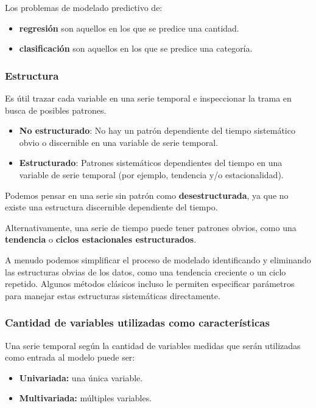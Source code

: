 \documentclass[a4paper,12pt]{article}
\begin{document}
Los problemas de modelado predictivo de:

\begin{itemize}
	\item \textbf{regresión} son aquellos en los que se predice una cantidad.
	\item  \textbf{clasificación} son aquellos en los que se predice una categoría.
\end{itemize}

\subsubsection{Estructura}

Es útil trazar cada variable en una serie temporal e inspeccionar la trama en busca de posibles patrones.

\begin{itemize}
	\item \textbf{No estructurado}: No hay un patrón dependiente del tiempo sistemático obvio o discernible en una variable de serie temporal.

	\item \textbf{Estructurado}: Patrones sistemáticos dependientes del tiempo en una variable de serie temporal (por ejemplo, tendencia y/o estacionalidad).
\end{itemize}

Podemos pensar en una serie sin patrón como \textbf{desestructurada}, ya que no existe una estructura discernible dependiente del tiempo.

Alternativamente, una serie de tiempo puede tener patrones obvios, como una \textbf{tendencia} o \textbf{ciclos estacionales estructurados}.

A menudo podemos simplificar el proceso de modelado identificando y eliminando las estructuras obvias de los datos, como una tendencia creciente o un ciclo repetido. Algunos métodos clásicos incluso le permiten especificar parámetros para manejar estas estructuras sistemáticas directamente.

\subsubsection{Cantidad de variables utilizadas como características}

Una serie temporal según la cantidad de variables medidas que serán utilizadas como entrada al modelo puede ser:
\begin{itemize}
	\item \textbf{Univariada:} una única variable.
	\item \textbf{Multivariada:} múltiples variables. 
\end{itemize}
\end{document}

